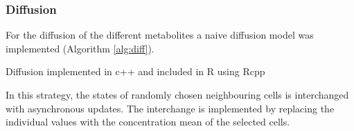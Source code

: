 \subsubsection{Diffusion}
For the diffusion of the different metabolites a naive diffusion model was implemented (Algorithm \hyperref[alg:diff]{\ref{alg:diff}}).
\begin{algorithm}
  \caption{Diffusion implemented in c++ and included in R using Rcpp \cite{dirk}}
  \SetAlgoLined
  \label{alg:diff}
\end{algorithm}
In this strategy, the states of randomly chosen neighbouring cells is interchanged with asynchronous updates. The interchange is implemented by replacing the individual values with the concentration mean of the selected cells.
